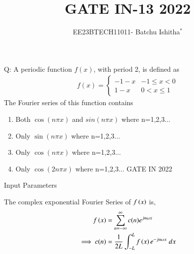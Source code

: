 \documentclass[journal,12pt,onecolumn]{IEEEtran}
\theoremstyle{remark}
\begin{document}
\let\vec\mathbf



\title{ GATE IN-13 2022}
\author{EE23BTECH11011- Batchu Ishitha$^{*}$%
}
\maketitle




\bigskip

\renewcommand{\thefigure}{\theenumi}
\renewcommand{\thetable}{\theenumi}

Q: A periodic function $f(x)$, with period 2, is defined as \\
   \begin{align}   
   f(x) =
   \begin{cases}
    -1-x & -1 \leq x<0 \\
     1-x &  0 <x \leq1 
   \end{cases}
   \end{align} 
   The Fourier series of this function contains \\
\begin{enumerate}[label=\Alph*.]
\item Both $\cos(n\pi x)$ and $sin(n\pi x)$ where n=1,2,3...
\item Only $\sin(n\pi x)$ where n=1,2,3...
\item Only $\cos(n\pi x)$ where n=1,2,3...
\item Only $\cos(2n\pi x)$ where n=1,2,3...  \hfill{GATE IN 2022 }
\end{enumerate} 

\solution

\begin{table}[!ht]    
    \centering
    
    \caption{Input Parameters}
    \label{table:ishitha.g22.in.13.t1}
\end{table}

The complex exponential Fourier Series of $f\left(x\right)$ is,
\begin{align}
    f\left(x\right)&=\sum_{n=-\infty}^{\infty}c(n)e^{jn\omega x}\\
    \implies c(n)&=\frac{1}{2L}\int_{-L}^{L}f\left(x\right)e^{-jn\omega x}\;dx\\
\end{align}    
\end{document}
